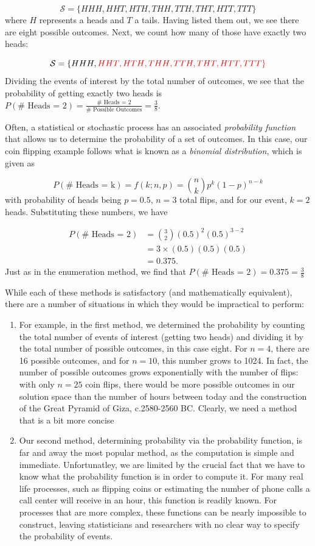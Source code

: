 \documentclass[
]{book}
\theoremstyle{definition}
\theoremstyle{definition}
\theoremstyle{definition}
\theoremstyle{remark}
\begin{document}
\[
\mathcal{S} = \{HHH, HHT, HTH, THH, TTH, THT, HTT, TTT\}
\]
where \(H\) represents a heads and \(T\) a tails. Having listed them out, we see there are eight possible outcomes. Next, we count how many of those have exactly two heads:

\[
\mathcal{S} = \{HHH, \color{red}{HHT}, \color{red}{HTH}, \color{red}{THH}, TTH, THT, HTT, TTT\}
\]
Dividing the events of interest by the total number of outcomes, we see that the probability of getting exactly two heads is \(P(\text{# Heads = 2}) = \frac{\text{# Heads = 2}}{\text{# Possible Outcomes}} = \frac38\).

Often, a statistical or stochastic process has an associated \emph{probability function} that allows us to determine the probability of a set of outcomes. In this case, our coin flipping example follows what is known as a \emph{binomial distribution}, which is given as

\[
P(\text{# Heads = k}) = f(k; n,p) = \binom{n}{k}p^k(1-p)^{n-k}
\]
with probability of heads being \(p = 0.5\), \(n = 3\) total flips, and for our event, \(k = 2\) heads. Substituting these numbers, we have

\[
\begin{align*}
P(\text{# Heads = 2}) &= \binom{3}{2} (0.5)^2 (0.5)^{3-2} \\
&= 3 \times (0.5)(0.5)(0.5) \\
&= 0.375.
\end{align*}
\]
Just as in the enumeration method, we find that \(P(\text{# Heads = 2}) = 0.375 = \frac38\)

While each of these methods is satisfactory (and mathematically equivalent), there are a number of situations in which they would be impractical to perform:

\begin{enumerate}
\def\labelenumi{\arabic{enumi}.}
\item
  For example, in the first method, we determined the probability by counting the total number of events of interest (getting two heads) and dividing it by the total number of possible outcomes, in this case eight. For \(n = 4\), there are 16 possible outcomes, and for \(n = 10\), this number grows to 1024. In fact, the number of possible outcomes grows exponentially with the number of flips: with only \(n = 25\) coin flips, there would be more possible outcomes in our solution space than the number of hours between today and the construction of the Great Pyramid of Giza, c.2580-2560 BC. Clearly, we need a method that is a bit more concise
\item
  Our second method, determining probability via the probability function, is far and away the most popular method, as the computation is simple and immediate. Unfortunatley, we are limited by the crucial fact that we have to know what the probability function is in order to compute it. For many real life processes, such as flipping coins or estimating the number of phone calls a call center will receive in an hour, this function is readily known. For processes that are more complex, these functions can be nearly impossible to construct, leaving statisticians and researchers with no clear way to specify the probability of events.
\end{enumerate}
\end{document}
